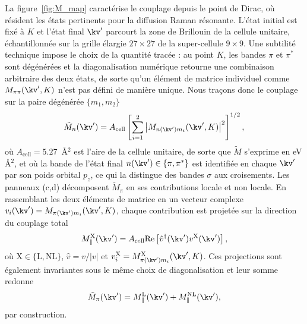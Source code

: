 La figure~\ref{fig:M_map} caractérise le couplage depuis le point de Dirac, où résident les états pertinents pour la diffusion Raman résonante. L'état initial est fixé à $K$ et l'état final $\kv'$ parcourt la zone de Brillouin de la cellule unitaire, échantillonnée sur la grille élargie $27\times 27$ de la super-cellule $9\times 9$. Une subtilité technique impose le choix de la quantité tracée : au point $K$, les bandes $\pi$ et $\pi^*$ sont dégénérées et la diagonalisation numérique retourne une combinaison arbitraire des deux états, de sorte qu'un élément de matrice individuel comme $M_{\pi\pi}(\kv',K)$ n'est pas défini de manière unique. Nous traçons donc le couplage sur la paire dégénérée $\{m_1,m_2\}$
\begin{equation}
    \tilde M_n(\kv') = A_\text{cell}\left[\sum_{i=1}^2\left|M_{n(\kv')m_i}(\kv',K)\right|^2\right]^{1/2},\label{eqn:M_tilde}
\end{equation}
où $A_\text{cell} = 5.27$~\AA$^2$ est l'aire de la cellule unitaire, de sorte que $\tilde M$ s'exprime en eV\,\AA$^2$, et où la bande de l'état final $n(\kv')\in\{\pi,\pi^*\}$ est identifiée en chaque $\kv'$ par son poids orbital $p_z$, ce qui la distingue des bandes $\sigma$ aux croisements. Les panneaux (c,d) décomposent $\tilde M_\pi$ en ses contributions locale et non locale. En rassemblant les deux éléments de matrice en un vecteur complexe $v_i(\kv') = M_{\pi(\kv')m_i}(\kv',K)$, chaque contribution est projetée sur la direction du couplage total
\begin{equation}
    M^\text{X}_\parallel(\kv')= A_\text{cell}\mathrm{Re}\left[\hat v^\dagger(\kv')v^\text{X}(\kv')\right],\label{eqn:M_projection}
\end{equation}
où $\text{X}\in\{\text{L},\text{NL}\}$, $\hat v = v/|v|$ et $v_i^\text{X}= M^\text{X}_{\pi(\kv')m_i}(\kv',K)$. Ces projections sont également invariantes sous le même choix de diagonalisation et leur somme redonne
\begin{equation*}
    \tilde M_{\pi}(\kv') = M^\text{L}_\parallel(\kv') + M^\text{NL}_\parallel(\kv'),
\end{equation*}
par construction.

